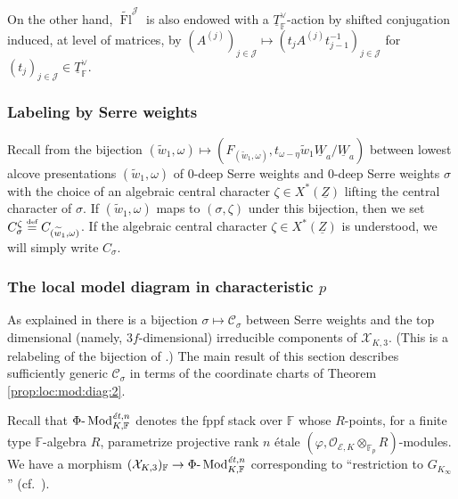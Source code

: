 \documentclass[oneside,a4paper,english, 11pt]{amsart}
\theoremstyle{plain}
\theoremstyle{plain}
\theoremstyle{plain}
\theoremstyle{plain}
\theoremstyle{plain}
\theoremstyle{plain}
\theoremstyle{definition}
\theoremstyle{definition}
\theoremstyle{definition}
\theoremstyle{remark}
\numberwithin{equation}{section}
\newcommand{\F}{\mathbb{F}}
\newcommand{\cC}{\mathcal{C}}
\newcommand{\cE}{\mathcal{E}}
\newcommand{\cJ}{\mathcal{J}}
\newcommand{\cO}{\mathcal{O}}
\newcommand{\cX}{\mathcal{X}}
\newcommand{\phz}{\varphi}
\newcommand{\Fp}{\F_p}
\newcommand{\un}[1]{\underline{#1}}
\newcommand{\tld}[1]{\widetilde{#1}}
\newcommand{\defeq}{\stackrel{\textrm{\tiny{def}}}{=}}
\DeclareMathOperator{\Mod}{Mod}
\DeclareMathOperator{\Fl}{Fl}
\begin{document}
On the other hand, $\tld{\Fl}^{\cJ}$ is also endowed with a $\un{T}_\F^\vee$-action by shifted conjugation induced, at level of matrices, by $(A^{(j)})_{j \in \cJ} \mapsto (t_{j} A^{(j)} t^{-1}_{j-1})_{j \in \cJ}$ for $(t_j)_{j \in \cJ} \in \un{T}_\F^\vee$.

\subsubsection{Labeling by Serre weights}
Recall from \cite[Lemma 2.2.3]{MLM} the bijection $(\tld{w}_1,\omega) \mapsto (F_{(\tld{w}_1,\omega)},t_{\omega-\eta}\tld{w}_1 \un{W}_a/\un{W}_a)$ between lowest alcove presentations $(\tld{w}_1,\omega)$ of $0$-deep Serre weights and $0$-deep Serre weights $\sigma$ with the choice of an algebraic central character $\zeta\in X^*(\un{Z})$ lifting the central character of $\sigma$. 
If $(\tld{w}_1,\omega)$ maps to $(\sigma,\zeta)$ under this bijection, then we set $C^\zeta_{\sigma}\defeq C_{(\tld{w}_1,\omega)}$. 
If the algebraic central character $\zeta\in X^*(\un{Z})$ is understood, we will simply write $C_{\sigma}$. 

\subsubsection{The local model diagram in characteristic $p$}
As explained in \cite[\S 7.4]{MLM} there is a bijection $\sigma\mapsto \cC_\sigma$  between Serre weights and the top dimensional (namely, $3f$-dimensional) irreducible components of $\cX_{K,3}$.
(This is a relabeling of the bijection of \cite[Theorem 6.5.1]{EGstack}.)
The main result of this section describes sufficiently generic $\cC_\sigma$ in terms of the coordinate charts of Theorem \ref{prop:loc:mod:diag:2}.

Recall that $\Phi\text{-}\Mod^{\text{\emph{\'et}},n}_{K, \F}$ denotes the fppf stack over $\F$ whose $R$-points, for a finite type $\F$-algebra $R$, parametrize projective rank $n$ \'etale $(\phz, \cO_{\cE,K}\otimes_{\Fp}R)$-modules.
We have a morphism $(\cX_{K,3})_{\F}\rightarrow \Phi\text{-}\Mod^{\text{\emph{\'et}},n}_{K, \F}$ corresponding to ``restriction to $G_{K_\infty}$'' (cf.~\cite[\S 3.2]{EGstack}).
\end{document}
